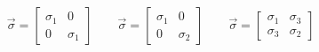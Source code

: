 \begin{equation}
\begin{aligned}
\vec{\sigma} = \left[\begin{matrix}
    \sigma_{1} & 0 \\ 0 & \sigma_{1}
\end{matrix}\right]
\qquad
\vec{\sigma} = \left[\begin{matrix}
    \sigma_{1} & 0 \\ 0 & \sigma_{2}
\end{matrix}\right]
\qquad
\vec{\sigma} = \left[\begin{matrix}
    \sigma_{1} & \sigma_{3} \\ \sigma_{3} & \sigma_{2}
\end{matrix}\right]
\end{aligned}
\end{equation}
